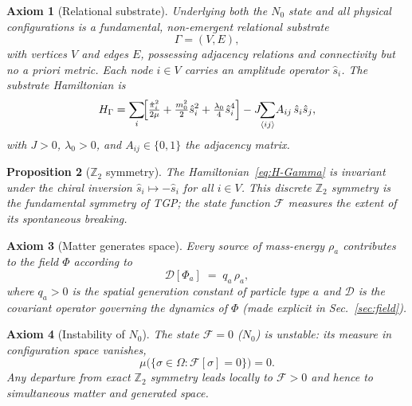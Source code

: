 \documentclass[11pt,a4paper]{article}
\renewcommand{\Phi}{\varPhi}
\newcommand{\Nzero}{N_{0}}
\newcommand{\Ffield}{\mathcal{F}}
\newcommand{\Zp}{\mathbb{Z}_{2}}
\newcommand{\DD}{\mathcal{D}}
\newtheorem{axiom}{Axiom}
\newtheorem{proposition}[axiom]{Proposition}
\begin{document}
\begin{axiom}[Relational substrate]\label{ax:substrate}
Underlying both the $\Nzero$ state and all physical configurations is a
fundamental, non-emergent relational substrate
\begin{equation}\label{eq:Gamma}
  \Gamma=(V,E),
\end{equation}
with vertices $V$ and edges $E$, possessing adjacency relations and
connectivity but \emph{no a priori metric}. Each node $i\in V$ carries an
amplitude operator $\hat{s}_{i}$. The substrate Hamiltonian is
\begin{equation}\label{eq:H-Gamma}
  H_{\Gamma}=\sum_{i}\!\Bigl[
    \tfrac{\hat{\pi}_{i}^{2}}{2\mu}
    +\tfrac{m_{0}^{2}}{2}\hat{s}_{i}^{2}
    +\tfrac{\lambda_{0}}{4}\hat{s}_{i}^{4}
  \Bigr]
  - J\!\!\sum_{\langle ij\rangle}\! A_{ij}\,\hat{s}_{i}\hat{s}_{j},
\end{equation}
with $J>0$, $\lambda_{0}>0$, and $A_{ij}\in\{0,1\}$ the adjacency matrix.
\end{axiom}

\begin{proposition}[$\Zp$ symmetry]\label{prop:Z2}
The Hamiltonian~\eqref{eq:H-Gamma} is invariant under the chiral inversion
$\hat{s}_{i}\mapsto-\hat{s}_{i}$ for all $i\in V$. This discrete $\Zp$
symmetry is the fundamental symmetry of TGP; the state function $\Ffield$
measures the extent of its spontaneous breaking.
\end{proposition}

\begin{axiom}[Matter generates space]\label{ax:source}
Every source of mass-energy $\rho_{a}$ contributes to the field $\Phi$
according to
\begin{equation}\label{eq:source}
  \DD[\Phi_{a}]\;=\;q_{a}\,\rho_{a},
\end{equation}
where $q_{a}>0$ is the \emph{spatial generation constant} of particle
type $a$ and $\DD$ is the covariant operator governing the dynamics of
$\Phi$ (made explicit in Sec.~\ref{sec:field}).
\end{axiom}

\begin{axiom}[Instability of $\Nzero$]\label{ax:P3}
The state $\Ffield=0$ ($\Nzero$) is unstable: its measure in configuration
space vanishes,
\begin{equation}
  \mu\bigl(\{\sigma\in\Omega : \Ffield[\sigma]=0\}\bigr)=0.
\end{equation}
Any departure from exact $\Zp$ symmetry leads locally to $\Ffield>0$ and
hence to simultaneous matter and generated space.
\end{axiom}
\end{document}

